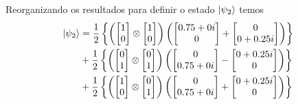 Reorganizando os resultados para definir o estado $\ket{\psi_2}$ temos
\begin{equation}
 \begin{split}
   \ket{\psi_2} &=\frac{1}{2} \left\{ \left(\begin{bmatrix} 1 \\ 0 \end{bmatrix} \otimes
                  \begin{bmatrix} 1 \\ 0 \end{bmatrix}\right) \left( \begin{bmatrix} {0.75+0i} \\ 0 \end{bmatrix} +
                  \begin{bmatrix} 0 \\ {0+0.25i} \end{bmatrix}\right)\right\} \\
                &+\frac{1}{2} \left\{ \left(\begin{bmatrix} 0 \\ 1 \end{bmatrix} \otimes
                  \begin{bmatrix} 0 \\ 1 \end{bmatrix}\right) \left( \begin{bmatrix} 0 \\ {0.75+0i} \end{bmatrix} -
                  \begin{bmatrix} {0+0.25i} \\ 0 \end{bmatrix}\right)\right\} \\
                &+\frac{1}{2} \left\{\left( \begin{bmatrix} 1 \\ 0 \end{bmatrix} \otimes
                  \begin{bmatrix} 0 \\ 1 \end{bmatrix}\right) \left( \begin{bmatrix} 0 \\ {0.75+0i} \end{bmatrix} +
                  \begin{bmatrix} {0+0.25i} \\ 0 \end{bmatrix}\right)\right\} \\

\end{split}
\end{equation}
